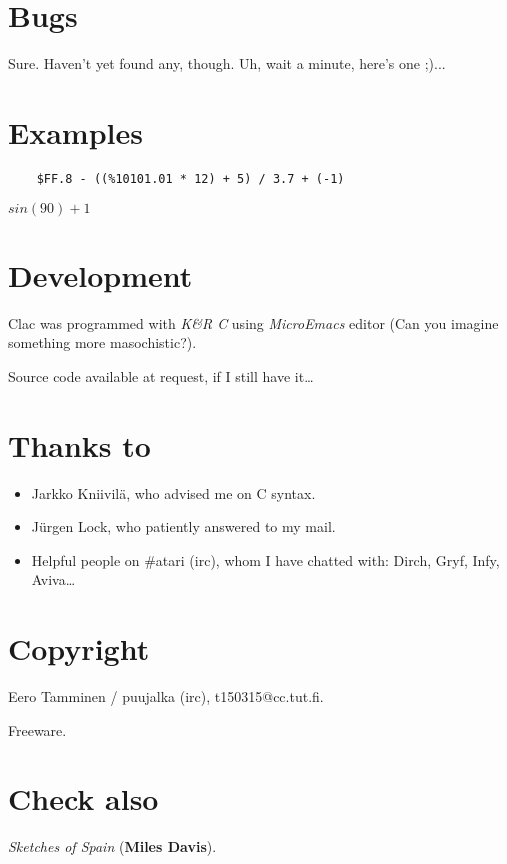 \section{Bugs}

	Sure. Haven't yet found any, though. Uh, wait a minute, here's
	one ;)...


\section{Examples}

	{\tt \begin{verbatim}
	$FF.8 - ((%10101.01 * 12) + 5) / 3.7 + (-1)
	\end{verbatim}}

	$ sin(90) + 1 $


\section{Development}

	Clac was programmed with {\sl K\&R C} using {\sl MicroEmacs} editor
	(Can you imagine something more masochistic?).

	Source code available at request, if I still have it\dots


\section{Thanks to}

	\begin{itemize}
	\item	Jarkko Kniivil\"a, who advised me on C syntax.
	\item	J\"urgen Lock, who patiently answered to my mail.
	\item	Helpful people on \#atari (irc), whom I have
		chatted with: Dirch, Gryf, Infy, Aviva\dots
	\end{itemize}

\section{Copyright}

	Eero Tamminen / puujalka (irc), t150315@cc.tut.fi.

	Freeware.


\section{Check also}

	{\sl Sketches of Spain} ({\bf Miles Davis}).


